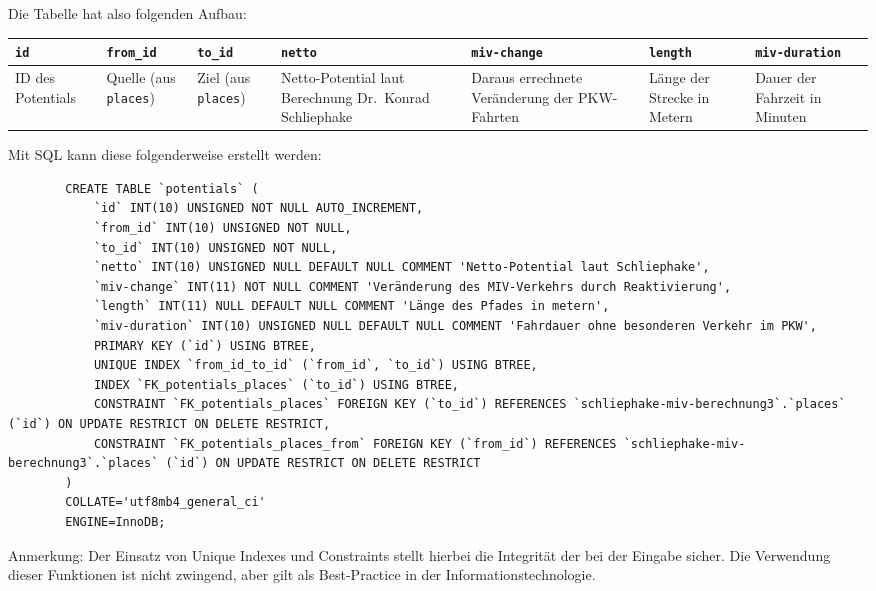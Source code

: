 \documentclass[fontsize=12pt,a4paper]{scrreprt}
\begin{document}
Die Tabelle hat also folgenden Aufbau:

\begin{table}[htbp]
        \begin{tabularx}{\textwidth}{|*7{X|}}
                \hline
                \texttt{id}       & \texttt{from_id}             & \texttt{to_id}             & \texttt{netto}                                          & \texttt{miv-change}                           & \texttt{length}             & \texttt{miv-duration}         \\
                \hline
                ID des Potentials & Quelle (aus \texttt{places}) & Ziel (aus \texttt{places}) & Netto-Potential laut Berechnung Dr.\ Konrad Schliephake & Daraus errechnete Veränderung der PKW-Fahrten & Länge der Strecke in Metern & Dauer der Fahrzeit in Minuten \\
                \hline
        \end{tabularx}
\end{table}

Mit SQL kann diese folgenderweise erstellt werden:
\begingroup
{}
\begin{verbatim}
        CREATE TABLE `potentials` (
            `id` INT(10) UNSIGNED NOT NULL AUTO_INCREMENT,
            `from_id` INT(10) UNSIGNED NOT NULL,
            `to_id` INT(10) UNSIGNED NOT NULL,
            `netto` INT(10) UNSIGNED NULL DEFAULT NULL COMMENT 'Netto-Potential laut Schliephake',
            `miv-change` INT(11) NOT NULL COMMENT 'Veränderung des MIV-Verkehrs durch Reaktivierung',
            `length` INT(11) NULL DEFAULT NULL COMMENT 'Länge des Pfades in metern',
            `miv-duration` INT(10) UNSIGNED NULL DEFAULT NULL COMMENT 'Fahrdauer ohne besonderen Verkehr im PKW',
            PRIMARY KEY (`id`) USING BTREE,
            UNIQUE INDEX `from_id_to_id` (`from_id`, `to_id`) USING BTREE,
            INDEX `FK_potentials_places` (`to_id`) USING BTREE,
            CONSTRAINT `FK_potentials_places` FOREIGN KEY (`to_id`) REFERENCES `schliephake-miv-berechnung3`.`places` (`id`) ON UPDATE RESTRICT ON DELETE RESTRICT,
            CONSTRAINT `FK_potentials_places_from` FOREIGN KEY (`from_id`) REFERENCES `schliephake-miv-berechnung3`.`places` (`id`) ON UPDATE RESTRICT ON DELETE RESTRICT
        )
        COLLATE='utf8mb4_general_ci'
        ENGINE=InnoDB;
    \end{verbatim}
\endgroup
Anmerkung: Der Einsatz von Unique Indexes und Constraints stellt hierbei die Integrität der bei der Eingabe sicher. Die Verwendung dieser Funktionen ist nicht zwingend, aber gilt als Best-Practice in der Informationstechnologie.
\end{document}
